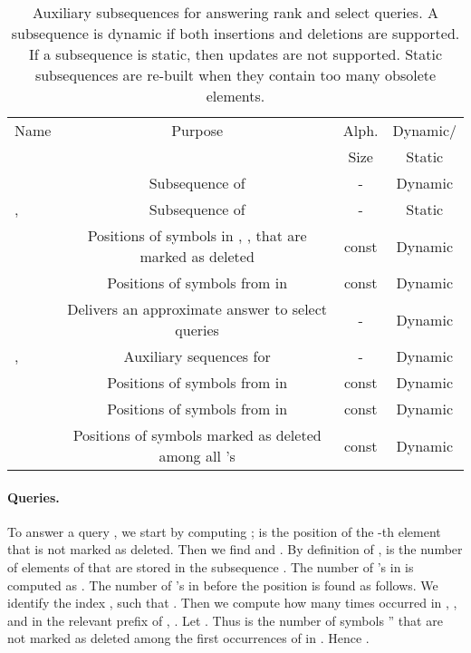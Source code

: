 \documentclass[11pt]{article}\usepackage{fullpage}
\newcommand{\no}[1]{}
\begin{document}
\begin{table}[tb]
  \centering
  \begin{tabular}{|l|c|c|c|} \hline
    Name & Purpose & Alph. & Dynamic/ \\
         &          & Size  & Static\\ \hline
                    & Subsequence of  & - & Dynamic \\
    ,  & Subsequence of  & - & Static \\
       & Positions of symbols in , , that are marked as deleted & const & Dynamic \\
                      & Positions of symbols from  in  \no{Relative order of symbols in  and  for } & const & Dynamic\\
                & Delivers an approximate answer to select queries          & -  & Dynamic \\
    ,  & Auxiliary sequences for                             & - & Dynamic \\
                    & Positions of symbols from  in                     & const & Dynamic \\
                    & Positions of symbols from  in   & const & Dynamic \\
                    & Positions of symbols marked as deleted among all 's    & const & Dynamic \\
\hline
  \end{tabular}
  \caption{Auxiliary subsequences for answering rank and select queries. A subsequence is dynamic if both insertions and deletions are supported. If a subsequence is static, then updates are not supported. Static subsequences are re-built when they contain too many obsolete elements.}
  \label{tab:auxdata}
\end{table}


\paragraph{Queries.}
To answer a query , we start by computing ;  is the position of the -th element that is not marked as deleted. Then we find  and . By definition of ,  is the number of elements of  that are stored in the subsequence . 
The number of 's in   is computed as .
The number of 's in  before the position  is 
found as follows. We identify the index , such that . 
Then we compute how many times  occurred in , , 
and in the relevant prefix of , . 
Let . Thus  is the number of symbols '' that are not marked as deleted among the first  occurrences of  in .
Hence .
\end{document}
